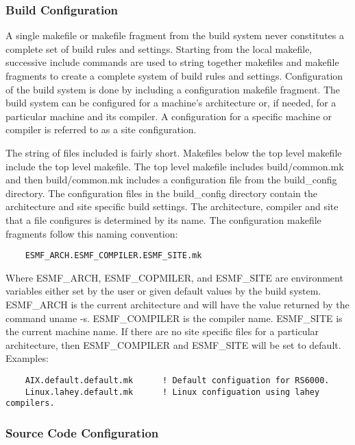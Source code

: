\subsubsection{Build Configuration}

A single makefile or makefile fragment from the build system never
constitutes a complete set of build rules and settings.  Starting from
the local makefile, successive include commands are used to string
together makefiles and makefile fragments to create a complete system
of build rules and settings.  Configuration of the build system is
done by including a configuration makefile fragment.  The build
system can be configured for a machine's architecture or, if needed,
for a particular machine and its compiler. A configuration for a
specific machine or compiler is referred to as a site configuration.

The string of files included is fairly short.  Makefiles below the top
level makefile include the top level makefile. The top level makefile
includes build/common.mk and then build/common.mk includes a
configuration file from the build\_config directory.  The configuration
files in the build\_config directory contain the architecture and site
specific build settings.  The architecture, compiler and site that a file
configures is determined by its name.  The configuration makefile
fragments follow this naming convention:

\begin{verbatim}
    ESMF_ARCH.ESMF_COMPILER.ESMF_SITE.mk
\end{verbatim}

Where ESMF\_ARCH, ESMF\_COPMILER, and ESMF\_SITE are environment
variables either set by the user or given default values by the build
system. ESMF\_ARCH is the current architecture and will have the value
returned by the command uname -s.  ESMF\_COMPILER is the compiler
name.  ESMF\_SITE is the current machine name. If there are no site
specific files for a particular architecture, then ESMF\_COMPILER and
ESMF\_SITE will be set to default.  Examples:

\begin{verbatim}
    AIX.default.default.mk      ! Default configuation for RS6000.
    Linux.lahey.default.mk      ! Linux configuation using lahey compilers.
\end{verbatim}

\subsubsection{Source Code Configuration}


